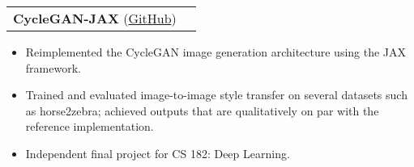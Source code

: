 \documentclass[letterpaper,11pt]{article}
\makeatletter
\newcommand{\resumeItem}[1]{
  \item\small{
    {#1 \vspace{-2pt}}
  }
}
\newcommand{\resumeProjectHeading}[2]{
    \vspace{-2pt}\item
    \begin{tabular*}{0.97\textwidth}{l@{\extracolsep{\fill}}r}
      \small#1 & #2 \\
    \end{tabular*}\vspace{-7pt}
}
\newcommand{\resumeItemListStart}{\begin{itemize}}
\newcommand{\resumeItemListEnd}{\end{itemize}\vspace{-5pt}}
\makeatother
\begin{document}
      \resumeProjectHeading
        {\textbf{CycleGAN-JAX} (\href{https://github.com/dlzou/cyclegan-jax}{\color{blue}GitHub})}{}
          \resumeItemListStart
            \resumeItem{Reimplemented the CycleGAN image generation architecture using the JAX framework.}
            \resumeItem{Trained and evaluated image-to-image style transfer on several datasets such as horse2zebra; achieved outputs that are qualitatively on par with the reference implementation.}
            \resumeItem{Independent final project for CS 182: Deep Learning.}
          \resumeItemListEnd
      
      
      
      
      
\end{document}
